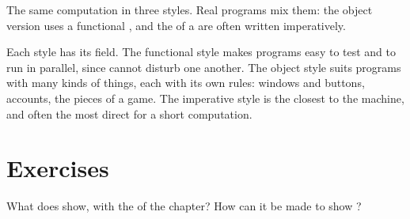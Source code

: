 \begin{omfigure}

{\small The same computation in three styles. Real programs mix them: the object version uses a functional
, and the  of a  are often written imperatively.}
\end{omfigure}

Each style has its field. The functional style makes programs easy to test and to run in parallel, since  cannot disturb one another. The object style suits programs with many kinds of things, each with its own
rules: windows and buttons, accounts, the pieces of a game. The imperative style is the closest to the machine, and
often the most direct for a short computation.

\section{Exercises}\label{sec:g12:classes-and-objects:exercises}

\begin{exercise}[$\star$]\label{exo:g12:classes-and-objects:1}
What does  show, with the  of the chapter? How can it be made to show ?
\end{exercise}

